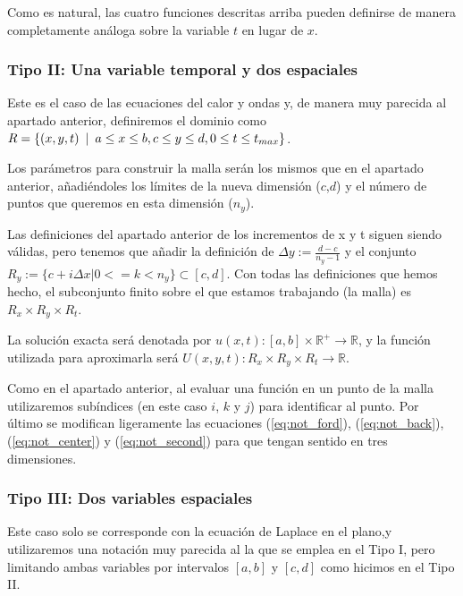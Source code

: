 Como es natural, las cuatro funciones descritas arriba pueden definirse de manera completamente análoga sobre la variable $t$ en lugar de $x$.

\subsubsection{Tipo II: Una variable temporal y dos espaciales}
Este es el caso de las ecuaciones del calor y ondas y, de manera muy parecida al apartado anterior, definiremos el dominio como $R=\{(x,y,t) \hspace{5px}|\hspace{5px} a\leq x\leq b, c\leq y\leq d, 0\leq t\leq t_{max}\}$.

Los parámetros para construir la malla serán los mismos que en el apartado anterior, añadiéndoles los límites de la nueva dimensión ($c$,$d$) y el número de puntos que queremos en esta dimensión ($n_y$).

Las definiciones del apartado anterior de los incrementos de x y t siguen siendo válidas, pero tenemos que añadir la definición de $\Delta y:=\frac{d-c}{n_y-1}$ y el conjunto $R_y:=\{c+i\Delta x|0<=k<n_y\}\subset[c,d]$. Con todas las definiciones que hemos hecho, el subconjunto finito sobre el que estamos trabajando (la malla) es $R_x\times R_y\times R_t$.

La solución exacta será denotada por $u(x,t):[a,b] \times\mathbb{R}^+ \longrightarrow\mathbb{R}$, y la función utilizada para aproximarla será $U(x,y,t):R_x\times R_y\times R_t\longrightarrow \mathbb{R}$.

Como en el apartado anterior, al evaluar una función en un punto de la malla utilizaremos subíndices (en este caso $i$, $k$ y $j$) para identificar al punto. Por último se modifican ligeramente las ecuaciones (\ref{eq:not_ford}), (\ref{eq:not_back}), (\ref{eq:not_center}) y (\ref{eq:not_second}) para que tengan sentido en tres dimensiones.

\subsubsection{Tipo III: Dos variables espaciales}
Este caso solo se corresponde con la ecuación de Laplace en el plano,y utilizaremos una notación muy parecida al la que se emplea en el Tipo I, pero limitando ambas variables por intervalos $[a,b]$ y $[c,d]$ como hicimos en el Tipo II.

